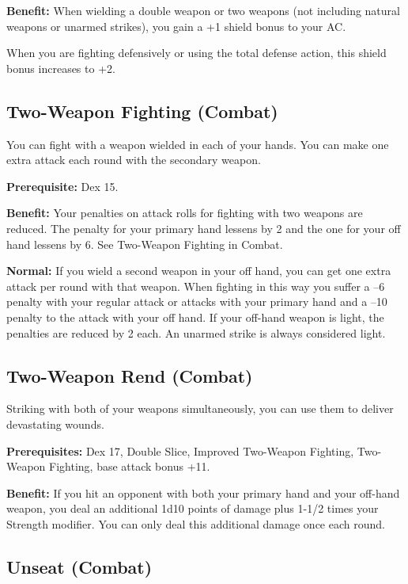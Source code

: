 \textbf{Benefit:} When wielding a double weapon or two weapons (not including natural weapons or unarmed strikes), you gain a +1 shield bonus to your AC.

When you are fighting defensively or using the total defense action, this shield bonus increases to +2.
				
\subsection{Two-Weapon Fighting (Combat)}

				
You can fight with a weapon wielded in each of your hands. You can make one extra attack each round with the secondary weapon.
				
\textbf{Prerequisite:} Dex 15.
				
\textbf{Benefit:} Your penalties on attack rolls for fighting with two weapons are reduced. The penalty for your primary hand lessens by 2 and the one for your off hand lessens by 6. See Two-Weapon Fighting in Combat.
				
\textbf{Normal:} If you wield a second weapon in your off hand, you can get one extra attack per round with that weapon. When fighting in this way you suffer a --6 penalty with your regular attack or attacks with your primary hand and a --10 penalty to the attack with your off hand. If your off-hand weapon is light, the penalties are reduced by 2 each. An unarmed strike is always considered light.
				
\subsection{Two-Weapon Rend (Combat)}

				
Striking with both of your weapons simultaneously, you can use them to deliver devastating wounds.
				
\textbf{Prerequisites:} Dex 17, Double Slice, Improved Two-Weapon Fighting, Two-Weapon Fighting, base attack bonus +11. 
				
\textbf{Benefit:} If you hit an opponent with both your primary hand and your off-hand weapon, you deal an additional 1d10 points of damage plus 1-1/2 times your Strength modifier. You can only deal this additional damage once each round.
				
\subsection{Unseat (Combat)}

